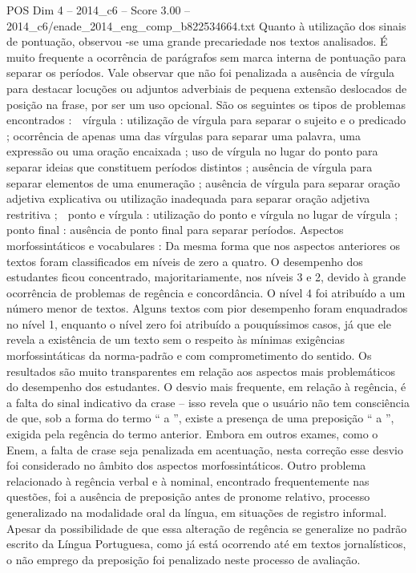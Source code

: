 \begin{textsample}{POS Dim 4 – 2014\_c6 – Score 3.00 – 2014\_c6/enade\_2014\_eng\_comp\_b822534664.txt}
Quanto à utilização dos sinais de pontuação, observou -se uma grande precariedade nos textos analisados.
É muito frequente a ocorrência de parágrafos sem marca interna de pontuação para separar os períodos.
Vale observar que não foi penalizada a ausência de vírgula para destacar locuções ou adjuntos adverbiais de pequena extensão deslocados de posição na frase, por ser um uso opcional.
São os seguintes os tipos de problemas encontrados :  vírgula : utilização de vírgula para separar o sujeito e o predicado ; ocorrência de apenas uma das vírgulas para separar uma palavra, uma expressão ou uma oração encaixada ; uso de vírgula no lugar do ponto para separar ideias que constituem períodos distintos ; ausência de vírgula para separar elementos de uma enumeração ; ausência de vírgula para separar oração adjetiva explicativa ou utilização inadequada para separar oração adjetiva restritiva ;  ponto e vírgula : utilização do ponto e vírgula no lugar de vírgula ;  ponto final : ausência de ponto final para separar períodos.
Aspectos morfossintáticos e vocabulares : Da mesma forma que nos aspectos anteriores os textos foram classificados em níveis de zero a quatro.
O desempenho dos estudantes ficou concentrado, majoritariamente, nos níveis 3 e 2, devido à grande ocorrência de problemas de regência e concordância.
O nível 4 foi atribuído a um número menor de textos.
Alguns textos com pior desempenho foram enquadrados no nível 1, enquanto o nível zero foi atribuído a pouquíssimos casos, já que ele revela a existência de um texto sem o respeito às mínimas exigências morfossintáticas da norma-padrão e com comprometimento do sentido.
Os resultados são muito transparentes em relação aos aspectos mais problemáticos do desempenho dos estudantes.
O desvio mais frequente, em relação à regência, é a falta do sinal indicativo da crase – isso revela que o usuário não tem consciência de que, sob a forma do termo “ a ”, existe a presença de uma preposição “ a ”, exigida pela regência do termo anterior.
Embora em outros exames, como o Enem, a falta de crase seja penalizada em acentuação, nesta correção esse desvio foi considerado no âmbito dos aspectos morfossintáticos.
Outro problema relacionado à regência verbal e à nominal, encontrado frequentemente nas questões, foi a ausência de preposição antes de pronome relativo, processo generalizado na modalidade oral da língua, em situações de registro informal.
Apesar da possibilidade de que essa alteração de regência se generalize no padrão escrito da Língua Portuguesa, como já está ocorrendo até em textos jornalísticos, o não emprego da preposição foi penalizado neste processo de avaliação.

\end{textsample}
